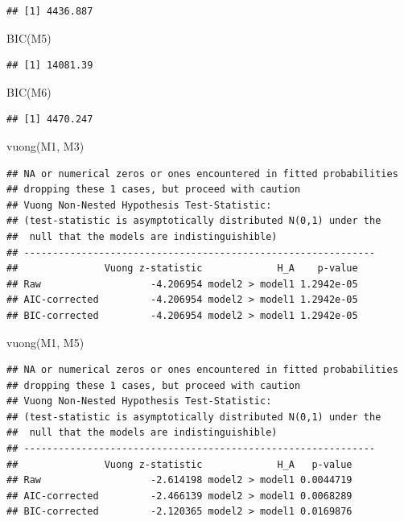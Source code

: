 \documentclass[
]{ctexart}
\newenvironment{Shaded}{\begin{snugshade}}{\end{snugshade}}
\newcommand{\FunctionTok}[1]{\textcolor[rgb]{0.00,0.00,0.00}{#1}}
\newcommand{\NormalTok}[1]{#1}
\begin{document}
\begin{verbatim}
## [1] 4436.887
\end{verbatim}

\begin{Shaded}
\begin{Highlighting}[]
\FunctionTok{BIC}\NormalTok{(M5)}
\end{Highlighting}
\end{Shaded}

\begin{verbatim}
## [1] 14081.39
\end{verbatim}

\begin{Shaded}
\begin{Highlighting}[]
\FunctionTok{BIC}\NormalTok{(M6)}
\end{Highlighting}
\end{Shaded}

\begin{verbatim}
## [1] 4470.247
\end{verbatim}

\begin{Shaded}
\begin{Highlighting}[]
\FunctionTok{vuong}\NormalTok{(M1, M3) }
\end{Highlighting}
\end{Shaded}

\begin{verbatim}
## NA or numerical zeros or ones encountered in fitted probabilities
## dropping these 1 cases, but proceed with caution
## Vuong Non-Nested Hypothesis Test-Statistic: 
## (test-statistic is asymptotically distributed N(0,1) under the
##  null that the models are indistinguishible)
## -------------------------------------------------------------
##               Vuong z-statistic             H_A    p-value
## Raw                   -4.206954 model2 > model1 1.2942e-05
## AIC-corrected         -4.206954 model2 > model1 1.2942e-05
## BIC-corrected         -4.206954 model2 > model1 1.2942e-05
\end{verbatim}

\begin{Shaded}
\begin{Highlighting}[]
\FunctionTok{vuong}\NormalTok{(M1, M5)  }
\end{Highlighting}
\end{Shaded}

\begin{verbatim}
## NA or numerical zeros or ones encountered in fitted probabilities
## dropping these 1 cases, but proceed with caution
## Vuong Non-Nested Hypothesis Test-Statistic: 
## (test-statistic is asymptotically distributed N(0,1) under the
##  null that the models are indistinguishible)
## -------------------------------------------------------------
##               Vuong z-statistic             H_A   p-value
## Raw                   -2.614198 model2 > model1 0.0044719
## AIC-corrected         -2.466139 model2 > model1 0.0068289
## BIC-corrected         -2.120365 model2 > model1 0.0169876
\end{verbatim}
\end{document}
